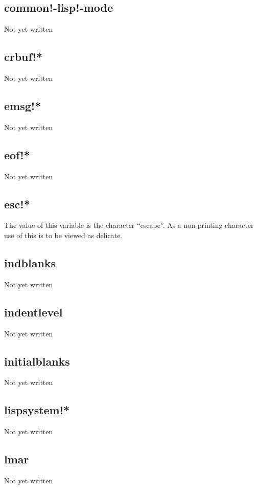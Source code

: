 \documentclass[a4paper,11pt]{article}
\begin{document}
\subsection{\ttfamily common!-lisp!-mode}
Not yet written

\subsection{\ttfamily crbuf!*}
Not yet written

\subsection{\ttfamily emsg!*}
Not yet written

\subsection{\ttfamily eof!*}
Not yet written

\subsection{\ttfamily esc!*}
The value of this variable is the character ``escape''. As a non-printing
character use of this is to be viewed as delicate.

\subsection{\ttfamily indblanks}
Not yet written

\subsection{\ttfamily indentlevel}
Not yet written

\subsection{\ttfamily initialblanks}
Not yet written

\subsection{\ttfamily lispsystem!*}
Not yet written

\subsection{\ttfamily lmar}
Not yet written
\end{document}
